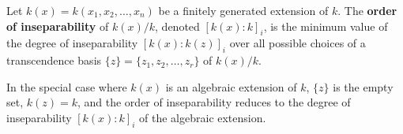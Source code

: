 Let $k(x) = k(x_1, x_2, \dots, x_n)$ be a finitely generated extension of $k$. The \textbf{order of inseparability} of $k(x)/k$, denoted $[k(x):k]_i$, is the minimum value of the degree of inseparability $[k(x):k(z)]_i$ over all possible choices of a transcendence basis $\{z\} = \{z_1, z_2, \dots, z_r\}$ of $k(x)/k$.

In the special case where $k(x)$ is an algebraic extension of $k$, $\{z\}$ is the empty set, $k(z) = k$, and the order of inseparability reduces to the degree of inseparability $[k(x):k]_i$ of the algebraic extension.
